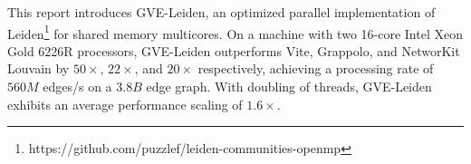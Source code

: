 This report introduces GVE-Leiden, an optimized parallel implementation of Leiden\footnote{https://github.com/puzzlef/leiden-communities-openmp} for shared memory multicores. On a machine with two 16-core Intel Xeon Gold 6226R processors, GVE-Leiden outperforms Vite, Grappolo, and NetworKit Louvain by $50\times$, $22\times$, and $20\times$ respectively, achieving a processing rate of $560 M$ edges/s on a $3.8 B$ edge graph. With doubling of threads, GVE-Leiden exhibits an average performance scaling of $1.6\times$.










